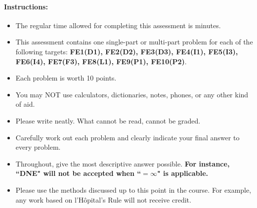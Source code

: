 \documentclass[11pt]{article}
\begin{document}
{\small

\paragraph*{Instructions:}

\begin{itemize}
    
    \item The regular time allowed for completing this assessment is  minutes.
    \item This assessment contains one single-part or multi-part problem for each of the following targets: \textbf{FE1(D1), FE2(D2), FE3(D3), FE4(I1), FE5(I3), FE6(I4), FE7(F3), FE8(L1), FE9(P1), FE10(P2)}.
    \item Each problem is worth 10 points.
    \item You may NOT use calculators, dictionaries, notes, phones, or any other kind of aid.
    \item Please write neatly. What cannot be read, cannot be graded.
    \item Carefully work out each problem and clearly indicate your final answer to every problem.
    \item Throughout, give the most descriptive answer possible. \textbf{For instance, ``DNE" will not be accepted when ``$=\infty$" is applicable.}
    \item Please use the methods discussed up to this point in the course. For example, any work based on l'H\^opital's Rule will not receive credit.

\end{itemize}}
\end{document}
